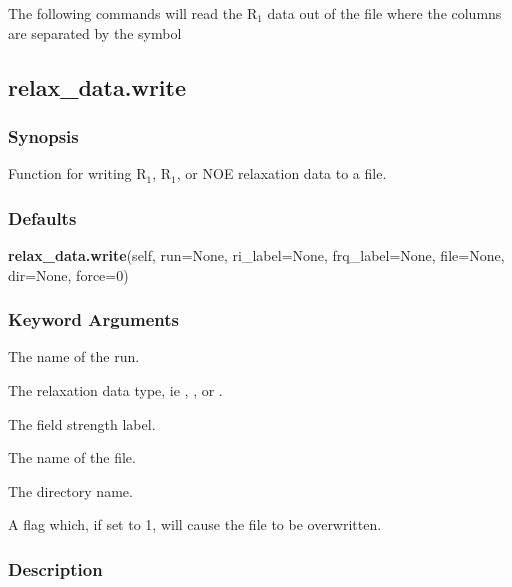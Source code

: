 
 The following commands will read the R$_1$ data out of the file  where the columns are separated by the symbol \quotecmd{\%} 
  


  

 \newpage 

 \subsection{relax\_data.write} 

  
 \subsubsection{Synopsis} 

 Function for writing R$_1$, R$_1$, or NOE relaxation data to a file. 
  

  
 \subsubsection{Defaults} 

 \textsf{\textbf{relax\_data.write}(self, run=None, ri\_label=None, frq\_label=None, file=None, dir=None, force=0)} 

  
 \subsubsection{Keyword Arguments} 

   The name of the run.   

   The relaxation data type, ie , , or .   

   The field strength label.   

   The name of the file.   

   The directory name.   

   A flag which, if set to 1, will cause the file to be overwritten.  

  

  
 \subsubsection{Description} 

